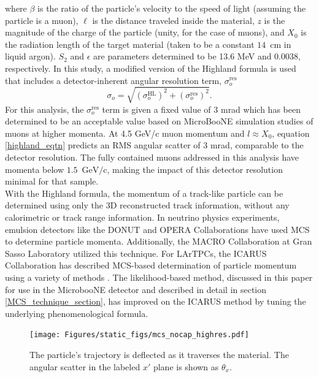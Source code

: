 \documentclass[a4paper,11pt]{article}
\begin{document}
\noindent where $\beta$ is the ratio of the particle's velocity to the speed of light (assuming the particle is a muon), $\ell$ is the distance traveled inside the material, $z$ is the magnitude of the charge of the particle (unity, for the case of muons), and $X_0$ is the radiation length of the target material (taken to be a constant $14$~cm in liquid argon). $S_2$ and $\epsilon$ are parameters determined to be 13.6 MeV and 0.0038, respectively. In this study, a modified version of the Highland formula is used that includes a detector-inherent angular resolution term, $\sigma_o^{\text{res}}$
\begin{equation}\label{modified_highland_eqtn}
\sigma_{o} = \sqrt{ (\sigma_o^{\text{HL}})^2 + (\sigma_o^{\text{res}})^2}.%
\end{equation}
For this analysis, the $\sigma_o^{\text{res}}$ term is given a fixed value of 3 mrad which has been determined to be an acceptable value based on MicroBooNE simulation studies of muons at higher momenta. At 4.5 GeV/c muon momentum and $l\approx X_0$, equation \ref{highland_eqtn} predicts an RMS angular scatter of 3 mrad, comparable to the detector resolution. The fully contained muons addressed in this analysis have momenta below $1.5$~$\text{GeV/c}$, making the impact of this detector resolution minimal for that sample.\\

With the Highland formula, the momentum of a track-like particle can be determined using only the 3D reconstructed track information, without any calorimetric or track range information. In neutrino physics experiments, emulsion detectors like the DONUT \cite{DONUT_paper} and OPERA \cite{OPERA_paper} Collaborations have used MCS to determine particle momenta. Additionally, the MACRO \cite{MACRO_paper} Collaboration at Gran Sasso Laboratory utilized this technique. For LArTPCs, the ICARUS Collaboration has described MCS-based determination of particle momentum using a variety of methods \cite{icarus_mcs_paper,new_icarus_paper}. The likelihood-based method, discussed in this paper for use in the MicrobooNE detector and described in detail in section \ref{MCS_technique_section}, has improved on the ICARUS method by tuning the underlying phenomenological formula.


\begin{figure}[ht!]
\centering
	\texttt{[image: Figures/static\_figs/mcs\_nocap\_highres.pdf]} \\
\caption{The particle's trajectory is deflected as it traverses the material. The angular scatter in the labeled $x'$ plane is shown as $\theta_x$.}\label{mcs_nocap_fig}
\end{figure}
\end{document}
